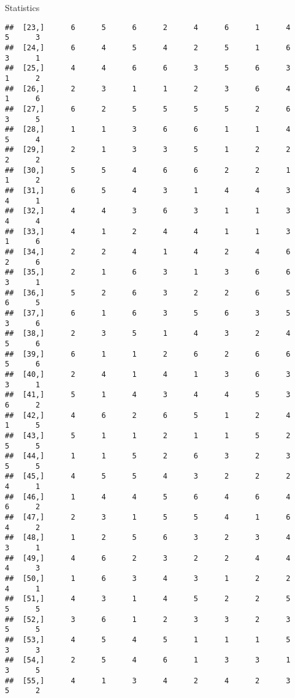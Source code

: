 \documentclass[
  ignorenonframetext,
]{beamer}
\begin{document}
\begin{frame}[fragile]{Statistics}
\begin{verbatim}
##  [23,]      6      5      6      2      4      6      1      4      5      3
##  [24,]      6      4      5      4      2      5      1      6      3      1
##  [25,]      4      4      6      6      3      5      6      3      1      2
##  [26,]      2      3      1      1      2      3      6      4      1      6
##  [27,]      6      2      5      5      5      5      2      6      3      5
##  [28,]      1      1      3      6      6      1      1      4      5      4
##  [29,]      2      1      3      3      5      1      2      2      2      2
##  [30,]      5      5      4      6      6      2      2      1      1      2
##  [31,]      6      5      4      3      1      4      4      3      4      1
##  [32,]      4      4      3      6      3      1      1      3      4      4
##  [33,]      4      1      2      4      4      1      1      3      1      6
##  [34,]      2      2      4      1      4      2      4      6      2      6
##  [35,]      2      1      6      3      1      3      6      6      3      1
##  [36,]      5      2      6      3      2      2      6      5      6      5
##  [37,]      6      1      6      3      5      6      3      5      3      6
##  [38,]      2      3      5      1      4      3      2      4      5      6
##  [39,]      6      1      1      2      6      2      6      6      5      6
##  [40,]      2      4      1      4      1      3      6      3      3      1
##  [41,]      5      1      4      3      4      4      5      3      6      2
##  [42,]      4      6      2      6      5      1      2      4      1      5
##  [43,]      5      1      1      2      1      1      5      2      5      5
##  [44,]      1      1      5      2      6      3      2      3      5      5
##  [45,]      4      5      5      4      3      2      2      2      4      1
##  [46,]      1      4      4      5      6      4      6      4      6      2
##  [47,]      2      3      1      5      5      4      1      6      4      2
##  [48,]      1      2      5      6      3      2      3      4      3      1
##  [49,]      4      6      2      3      2      2      4      4      4      3
##  [50,]      1      6      3      4      3      1      2      2      4      1
##  [51,]      4      3      1      4      5      2      2      5      5      5
##  [52,]      3      6      1      2      3      3      2      3      5      5
##  [53,]      4      5      4      5      1      1      1      5      3      3
##  [54,]      2      5      4      6      1      3      3      1      3      5
##  [55,]      4      1      3      4      2      4      2      3      5      2

\end{verbatim}
\end{frame}
\end{document}
